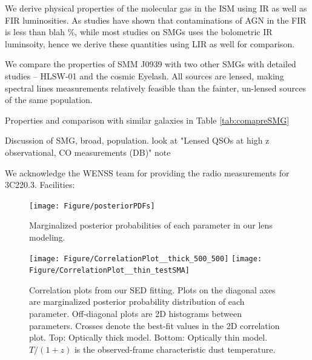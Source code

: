 \documentclass[twocolumn,apj,numberedappendix]{emulateapj}
\begin{document}
We derive physical properties of the molecular gas in the ISM using IR as well as FIR luminosities. As studies have shown that contaminations of AGN in the FIR is less than blah \%, while most studies on SMGs uses the bolometric IR luminsoity, hence we derive these quantities using LIR as well for comparison. 

We compare the properties of SMM J0939 with two other SMGs with detailed studies -- HLSW-01 and the cosmic Eyelash. All sources are lensed, making spectral lines measurements relatively feasible than the fainter, un-lensed sources of the same population.

Properties and comparison with similar galaxies in Table \ref{tab:comapreSMG}

Discussion of SMG, broad, population.
look at "Lensed QSOs at high z observational, CO measurements (DB)" note

\acknowledgments

We acknowledge the WENSS team for providing the radio measurements for 3C220.3.
Facilities: 




\appendix

\begin{figure}[!tbp]
\centering
\texttt{[image: Figure/posteriorPDFs]}
\caption{Marginalized posterior probabilities of each parameter in our lens modeling.
\label{fig:LensPDF}}
\end{figure}

\begin{figure}[!tbp]
\centering
\texttt{[image: Figure/CorrelationPlot\_\_thick\_500\_500]}
\texttt{[image: Figure/CorrelationPlot\_\_thin\_testSMA]}
\caption{Correlation plots from our SED fitting. Plots on the diagonal axes are marginalized posterior probability 
distribution of each
parameter. Off-diagonal plots are 2D histograms between parameters. Crosses denote the best-fit values in 
the 2D correlation plot. Top: Optically thick
model. Bottom: Optically thin model. $T/(1+z)$ is the observed-frame characteristic dust temperature.
\label{fig:sedlikelihood}}
\end{figure}
\end{document}
